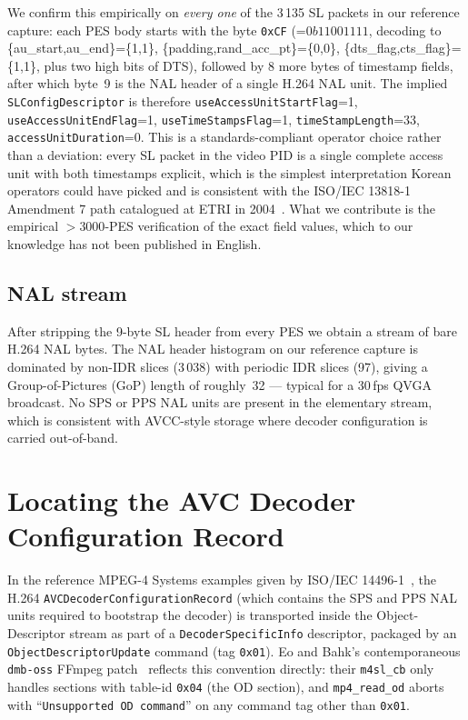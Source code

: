 \documentclass[11pt,a4paper]{article}
\begin{document}
We confirm this empirically on \emph{every one} of the 3\,135 SL
packets in our reference capture: each PES body starts with the byte
\texttt{0xCF} (=$0b11001111$, decoding to
\{au\_start,au\_end\}=\{1,1\}, \{padding,rand\_acc\_pt\}=\{0,0\},
\{dts\_flag,cts\_flag\}=\{1,1\}, plus two high bits of DTS), followed
by 8 more bytes of timestamp fields, after which byte~9 is the NAL
header of a single H.264 NAL unit.  The implied
\texttt{SLConfigDescriptor} is therefore
\texttt{useAccessUnitStartFlag}=1, \texttt{useAccessUnitEndFlag}=1,
\texttt{useTimeStampsFlag}=1,
\texttt{timeStampLength}=33,
\texttt{accessUnitDuration}=0.  This is a standards-compliant
operator choice rather than a deviation: every SL packet in the
video PID is a single complete access unit with both timestamps
explicit, which is the simplest interpretation Korean operators
could have picked and is consistent with the
ISO/IEC 13818-1 Amendment 7 path catalogued at ETRI in
2004~\cite{lee2004m4smux}.  What we contribute is the empirical
${>}3000$-PES verification of the exact field
values, which to our knowledge has not been published in English.

\subsection{NAL stream}

After stripping the 9-byte SL header from every PES we obtain a stream
of bare H.264 NAL bytes.  The NAL header histogram on our reference
capture is dominated by non-IDR slices (3\,038) with periodic IDR
slices (97), giving a Group-of-Pictures (GoP) length of roughly~32 ---
typical for a 30\,fps QVGA broadcast.  No SPS or PPS NAL units are
present in the elementary stream, which is consistent with
AVCC-style storage where decoder configuration is carried out-of-band.

\section{Locating the AVC Decoder Configuration Record}
\label{sec:avcc}

In the reference MPEG-4 Systems examples given by ISO/IEC
14496-1~\cite{iso14496-1}, the H.264
\texttt{AVCDecoderConfigurationRecord} (which contains the SPS and
PPS NAL units required to bootstrap the decoder) is transported
inside the Object-Descriptor stream as part of a
\texttt{DecoderSpecificInfo} descriptor, packaged by an
\texttt{ObjectDescriptorUpdate} command (tag \texttt{0x01}).  Eo and
Bahk's contemporaneous \texttt{dmb-oss} FFmpeg
patch~\cite{eo2024tdmb} reflects this convention directly: their
\texttt{m4sl\_cb} only handles sections with table-id
\texttt{0x04} (the OD section), and \texttt{mp4\_read\_od} aborts
with ``\texttt{Unsupported OD command}'' on any command tag
other than \texttt{0x01}.
\end{document}
